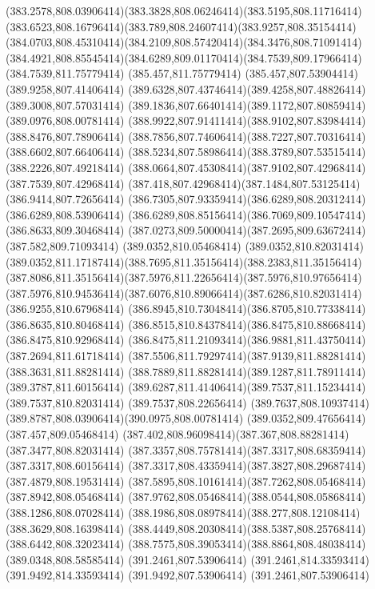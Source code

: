 {{	\curveto(383.2578,808.03906414)(383.3828,808.06246414)(383.5195,808.11716414)
	\curveto(383.6523,808.16796414)(383.789,808.24607414)(383.9257,808.35154414)
	\curveto(384.0703,808.45310414)(384.2109,808.57420414)(384.3476,808.71091414)
	\curveto(384.4921,808.85545414)(384.6289,809.01170414)(384.7539,809.17966414)
	\lineto(384.7539,811.75779414)
	\lineto(385.457,811.75779414)
	\lineto(385.457,807.53904414)
	\closepath
	\moveto(389.9258,807.41406414)
	\curveto(389.6328,807.43746414)(389.4258,807.48826414)(389.3008,807.57031414)
	\curveto(389.1836,807.66401414)(389.1172,807.80859414)(389.0976,808.00781414)
	\curveto(388.9922,807.91411414)(388.9102,807.83984414)(388.8476,807.78906414)
	\curveto(388.7856,807.74606414)(388.7227,807.70316414)(388.6602,807.66406414)
	\curveto(388.5234,807.58986414)(388.3789,807.53515414)(388.2226,807.49218414)
	\curveto(388.0664,807.45308414)(387.9102,807.42968414)(387.7539,807.42968414)
	\curveto(387.418,807.42968414)(387.1484,807.53125414)(386.9414,807.72656414)
	\curveto(386.7305,807.93359414)(386.6289,808.20312414)(386.6289,808.53906414)
	\curveto(386.6289,808.85156414)(386.7069,809.10547414)(386.8633,809.30468414)
	\curveto(387.0273,809.50000414)(387.2695,809.63672414)(387.582,809.71093414)
	\lineto(389.0352,810.05468414)
	\lineto(389.0352,810.82031414)
	\curveto(389.0352,811.17187414)(388.7695,811.35156414)(388.2383,811.35156414)
	\curveto(387.8086,811.35156414)(387.5976,811.22656414)(387.5976,810.97656414)
	\curveto(387.5976,810.94536414)(387.6076,810.89066414)(387.6286,810.82031414)
	\lineto(386.9255,810.67968414)
	\curveto(386.8945,810.73048414)(386.8705,810.77338414)(386.8635,810.80468414)
	\curveto(386.8515,810.84378414)(386.8475,810.88668414)(386.8475,810.92968414)
	\curveto(386.8475,811.21093414)(386.9881,811.43750414)(387.2694,811.61718414)
	\curveto(387.5506,811.79297414)(387.9139,811.88281414)(388.3631,811.88281414)
	\curveto(388.7889,811.88281414)(389.1287,811.78911414)(389.3787,811.60156414)
	\curveto(389.6287,811.41406414)(389.7537,811.15234414)(389.7537,810.82031414)
	\lineto(389.7537,808.22656414)
	\curveto(389.7637,808.10937414)(389.8787,808.03906414)(390.0975,808.00781414)
	\closepath
	\moveto(389.0352,809.47656414)
	\lineto(387.457,809.05468414)
	\curveto(387.402,808.96098414)(387.367,808.88281414)(387.3477,808.82031414)
	\curveto(387.3357,808.75781414)(387.3317,808.68359414)(387.3317,808.60156414)
	\curveto(387.3317,808.43359414)(387.3827,808.29687414)(387.4879,808.19531414)
	\curveto(387.5895,808.10161414)(387.7262,808.05468414)(387.8942,808.05468414)
	\curveto(387.9762,808.05468414)(388.0544,808.05868414)(388.1286,808.07028414)
	\curveto(388.1986,808.08978414)(388.277,808.12108414)(388.3629,808.16398414)
	\curveto(388.4449,808.20308414)(388.5387,808.25768414)(388.6442,808.32023414)
	\curveto(388.7575,808.39053414)(388.8864,808.48038414)(389.0348,808.58585414)
	\closepath
	\moveto(391.2461,807.53906414)
	\lineto(391.2461,814.33593414)
	\lineto(391.9492,814.33593414)
	\lineto(391.9492,807.53906414)
	\closepath
	\moveto(391.2461,807.53906414)
}
}

